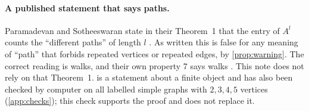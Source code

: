 \paragraph{A published statement that says paths.}
Paramadevan and Sotheeswaran state in their Theorem~1 that the entry of $A^l$ counts the ``different paths'' of length $l$ \cite{paramadevan2021adjacency}.
As written this is false for any meaning of ``path'' that forbids repeated vertices or repeated edges, by \cref{prop:warning}.
The correct reading is walks, and their own property 7 says walks \cite{paramadevan2021adjacency}.
This note does not rely on that Theorem~1.
 is a statement about a finite object and has also been checked by computer on all labelled simple graphs with $2,3,4,5$ vertices (\cref{app:checks}); this check supports the proof and does not replace it.
